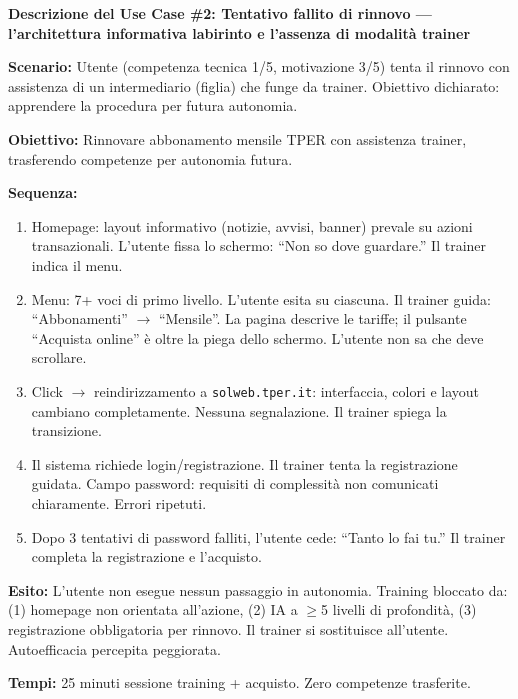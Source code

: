 ﻿\documentclass[11pt,a4paper]{article}
\begin{document}
\vspace{0.3cm}


\begin{tcolorbox}[sectionbox,colback=primaryColor!10]
    \textbf{Descrizione del Use Case \#2: Tentativo fallito di rinnovo --- l'architettura informativa labirinto e l'assenza di modalità trainer}
\end{tcolorbox}

\vspace{0.3cm}

\begin{tcolorbox}[base]
    {\small
    \textbf{Scenario:} Utente (competenza tecnica 1/5, motivazione 3/5) tenta il rinnovo con assistenza di un intermediario (figlia) che funge da trainer. Obiettivo dichiarato: apprendere la procedura per futura autonomia.

    \textbf{Obiettivo:} Rinnovare abbonamento mensile TPER con assistenza trainer, trasferendo competenze per autonomia futura.

    \textbf{Sequenza:}
    \begin{enumerate}
        \item Homepage: layout informativo (notizie, avvisi, banner) prevale su azioni transazionali. L'utente fissa lo schermo: ``Non so dove guardare.'' Il trainer indica il menu.
        \item Menu: 7+ voci di primo livello. L'utente esita su ciascuna. Il trainer guida: ``Abbonamenti'' $\rightarrow$ ``Mensile''. La pagina descrive le tariffe; il pulsante ``Acquista online'' è oltre la piega dello schermo. L'utente non sa che deve scrollare.
        \item Click $\rightarrow$ reindirizzamento a \texttt{solweb.tper.it}: interfaccia, colori e layout cambiano completamente. Nessuna segnalazione. Il trainer spiega la transizione.
        \item Il sistema richiede login/registrazione. Il trainer tenta la registrazione guidata. Campo password: requisiti di complessità non comunicati chiaramente. Errori ripetuti.
        \item Dopo 3 tentativi di password falliti, l'utente cede: ``Tanto lo fai tu.'' Il trainer completa la registrazione e l'acquisto.
    \end{enumerate}

    \textbf{Esito:} L'utente non esegue nessun passaggio in autonomia. Training bloccato da: (1) homepage non orientata all'azione, (2) IA a $\geq$5 livelli di profondità, (3) registrazione obbligatoria per rinnovo. Il trainer si sostituisce all'utente. Autoefficacia percepita peggiorata.

    \textbf{Tempi:} 25 minuti sessione training + acquisto. Zero competenze trasferite.
    }
\end{tcolorbox}
\end{document}
